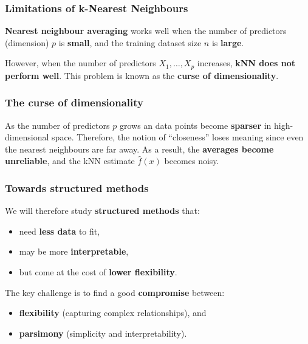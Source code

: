 \documentclass[
  letterpaper,
  DIV=11,
  numbers=noendperiod]{scrartcl}
\providecommand{\tightlist}{%
  \setlength{\itemsep}{0pt}\setlength{\parskip}{0pt}}\usepackage{longtable,booktabs,array}
\begin{document}
\subsubsection{Limitations of k-Nearest
Neighbours}\label{limitations-of-k-nearest-neighbours}

\textbf{Nearest neighbour averaging} works well when the number of
predictors (dimension) \(p\) is \textbf{small}, and the training dataset
size \(n\) is \textbf{large}.

However, when the number of predictors \(X_1, \ldots, X_p\) increases,
\textbf{kNN does not perform well}. This problem is known as the
\textbf{curse of dimensionality}.

\subsubsection{The curse of
dimensionality}\label{the-curse-of-dimensionality}

As the number of predictors \(p\) grows an data points become
\textbf{sparser} in high-dimensional space. Therefore, the notion of
``closeness'' loses meaning since even the nearest neighbours are far
away. As a result, the \textbf{averages become unreliable}, and the kNN
estimate \(\hat{f}(x)\) becomes noisy.

\subsubsection{Towards structured
methods}\label{towards-structured-methods}

We will therefore study \textbf{structured methods} that:

\begin{itemize}
\tightlist
\item
  need \textbf{less data} to fit,
\item
  may be more \textbf{interpretable},
\item
  but come at the cost of \textbf{lower flexibility}.
\end{itemize}

The key challenge is to find a good \textbf{compromise} between:

\begin{itemize}
\tightlist
\item
  \textbf{flexibility} (capturing complex relationships), and
\item
  \textbf{parsimony} (simplicity and interpretability).
\end{itemize}
\end{document}
